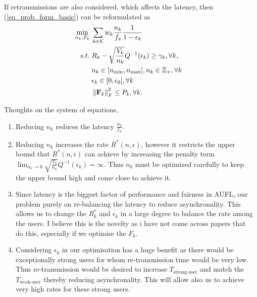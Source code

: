 \documentclass[a4paper, 12pt, onecolumn, journal, twoside, draftclsnofoot]{IEEEtran}
\begin{document}
If retransmissions are also considered, which affects the latency, then (\ref{eq_prob_form_basic}) can be reformulated as
\begin{equation}
	\begin{split}
		\min_{n_k, F_k} &\; \sum_{k \in { \mathcal{K} }} w_k \frac{n_k}{f_s} \frac{1}{1-\epsilon_k} \\
		s.t. &\;  R_k - \sqrt{\frac{V_k}{n_k}}Q^{-1}(\epsilon_k) \geq \gamma_k, \forall k, \\
		&\; n_k \in [ n_{\text{min}}, n_{\text{max}}], n_k \in \mathbb{Z}_+, \forall k \\
		&\; \epsilon_k \in [0, \epsilon_0], \forall k \\
		&\; \left\| {\bf F}_k \right\|_F^2  \leq P_k, \forall k. 
	\end{split}
\label{eq_prob_form_basic}
\end{equation} 

Thoughts on the system of equations,
\begin{enumerate}

    \item Reducing $n_k$ reduces the latency $\frac{n_k}{f_S}$.
    \item Reducing $n_k$ increases the rate $R^*(n,\epsilon)$, however it restricts the upper bound that $R^*(n,\epsilon)$ can achieve by increasing the penalty term $\displaystyle \lim_{n_k \to 0} \sqrt{\frac{V_k}{n_k}}Q^{-1}(\epsilon_k) = \infty$. Thus $n_k$ must be optimized carefully to keep the upper bound high and come close to achieve it.
    \item Since latency is the biggest factor of performance and fairness in AUFL, our problem purely on re-balancing the latency to reduce asynchronality. This allows us to change the $R^*_k$ and $\epsilon_k$ in a large degree to balance the rate among the users. I believe this is the novelty as i have not come across papers that do this, especially if we optimise the $F_k$. 
    \item Considering $\epsilon_k$ in our optimisation has a huge benefit as there would be exceptionally strong users for whom re-transmission time would be very low. Thus re-transmission would be desired to increase $T_{\text{strong-user}}$ and  match the $T_{\text{weak-user}}$ thereby reducing asynchronality. This will allow also us to achieve very high rates for these strong users. 

\end{enumerate}
\end{document}
